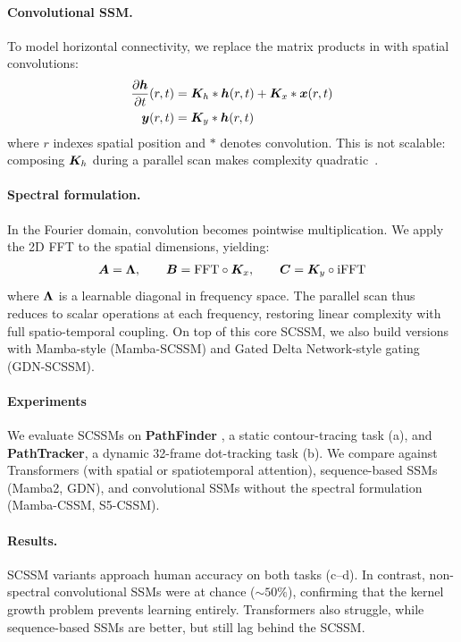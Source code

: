 \documentclass{ccn}  %
\begin{document}
\paragraph{Convolutional SSM.} To model horizontal connectivity, we replace the matrix products in  with spatial convolutions:
%
\begin{subequations}
    \label{eq:conv_ssm_continuous}
    \begin{align}
    \label{eq:conv_ssm_continuous:1}
      \frac{\partial \bm{h}}{\partial t}(r,t) &= \bm{K}_h \ast \bm{h}(r, t) + \bm{K}_x \ast \bm{x}(r, t) \\
      \bm{y}(r, t) &= \bm{K}_y \ast \bm{h}(r, t)
    \end{align}
\end{subequations}
%
where $r$ indexes spatial position and $\ast$ denotes convolution. This is not scalable: composing $\bm{K}_h$ during a parallel scan makes complexity quadratic~\citep{smith2023convs5}.
 
\paragraph{Spectral formulation.} In the Fourier domain, convolution becomes pointwise multiplication. We apply the 2D FFT to the spatial dimensions, yielding:
%
\begin{align}
\label{eq:convssm}
\bm{A} = \bm{\Lambda}, \qquad
\bm{B} = \text{FFT} \circ \bm{K}_x, \qquad
\bm{C} = \bm{K}_y \circ \text{iFFT}
\end{align}
%
where $\bm{\Lambda}$ is a learnable diagonal in frequency space. The parallel scan thus reduces to scalar operations at each frequency, restoring linear complexity with full spatio-temporal coupling. On top of this core SCSSM, we also build versions with Mamba-style (Mamba-SCSSM) and Gated Delta Network-style gating (GDN-SCSSM).

\paragraph{Experiments} We evaluate SCSSMs on \textbf{PathFinder} \citep{linsley2018}, a static contour-tracing task (a), and \textbf{PathTracker}, a dynamic 32-frame dot-tracking task (b). We compare against Transformers (with spatial or spatiotemporal attention), sequence-based SSMs (Mamba2, GDN), and convolutional SSMs without the spectral formulation (Mamba-CSSM, S5-CSSM).

\paragraph{Results.} SCSSM variants approach human accuracy on both tasks (c--d). In contrast, non-spectral convolutional SSMs were at chance (${\sim}50\%$), confirming that the kernel growth problem prevents learning entirely. Transformers also struggle, while sequence-based SSMs are better, but still lag behind the SCSSM.

\printbibliography
\end{document}
